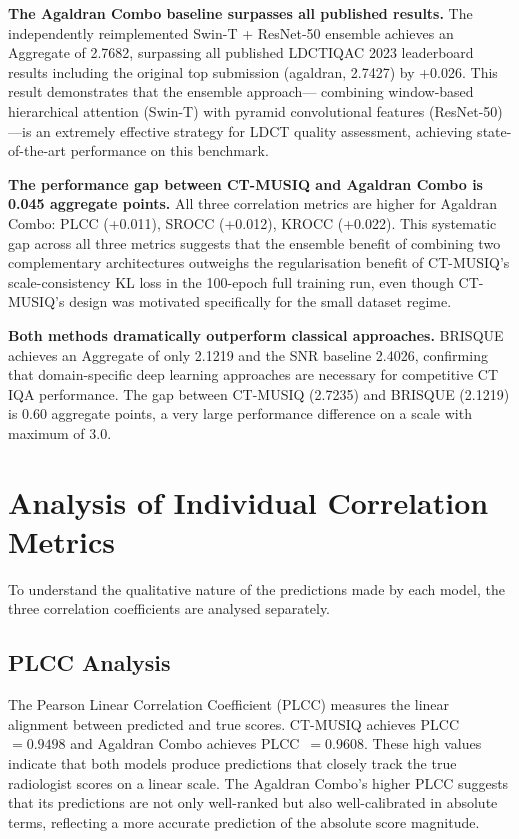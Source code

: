 \textbf{The Agaldran Combo baseline surpasses all published results.} The independently
reimplemented Swin-T + ResNet-50 ensemble achieves an Aggregate of 2.7682, surpassing
all published LDCTIQAC 2023 leaderboard results including the original top submission
(agaldran, 2.7427) by +0.026. This result demonstrates that the ensemble approach---
combining window-based hierarchical attention (Swin-T) with pyramid convolutional
features (ResNet-50)---is an extremely effective strategy for LDCT quality assessment,
achieving state-of-the-art performance on this benchmark.

\textbf{The performance gap between CT-MUSIQ and Agaldran Combo is 0.045 aggregate points.}
All three correlation metrics are higher for Agaldran Combo: PLCC (+0.011), SROCC (+0.012),
KROCC (+0.022). This systematic gap across all three metrics suggests that the ensemble
benefit of combining two complementary architectures outweighs the regularisation benefit
of CT-MUSIQ's scale-consistency KL loss in the 100-epoch full training run, even though
CT-MUSIQ's design was motivated specifically for the small dataset regime.

\textbf{Both methods dramatically outperform classical approaches.} BRISQUE achieves
an Aggregate of only 2.1219 and the SNR baseline 2.4026, confirming that domain-specific
deep learning approaches are necessary for competitive CT IQA performance. The gap between
CT-MUSIQ (2.7235) and BRISQUE (2.1219) is 0.60 aggregate points, a very large performance
difference on a scale with maximum of 3.0.


\section{Analysis of Individual Correlation Metrics}
\label{sec:results_corr}

To understand the qualitative nature of the predictions made by each model, the three
correlation coefficients are analysed separately.

\subsection{PLCC Analysis}

The Pearson Linear Correlation Coefficient (PLCC) measures the linear alignment between
predicted and true scores. CT-MUSIQ achieves PLCC~$= 0.9498$ and Agaldran Combo achieves
PLCC~$= 0.9608$. These high values indicate that both models produce predictions that
closely track the true radiologist scores on a linear scale. The Agaldran Combo's higher
PLCC suggests that its predictions are not only well-ranked but also well-calibrated in
absolute terms, reflecting a more accurate prediction of the absolute score magnitude.

